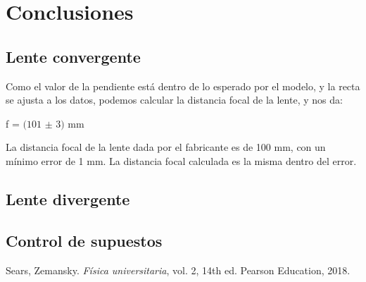 \documentclass[a4paper,12pt]{article}
\newenvironment{Figure}
  {\par\medskip\noindent\minipage{\linewidth}}
  {\endminipage\par\medskip}
\begin{document}
\begin{multicols*}{2}
\begin{Figure}
            \label{tab:supuestos}
        \end{Figure}

\section*{Conclusiones}

    \subsection*{Lente convergente}

        Como el valor de la pendiente está dentro de lo esperado por el modelo, y la recta se ajusta a los datos, podemos calcular la distancia focal de la lente, y nos da:

        f = $(101$ $\pm$ $3)$ mm

        La distancia focal de la lente dada por el fabricante es de 100 mm, con un mínimo error de 1 mm. La distancia focal calculada es la misma dentro del error.

    \subsection*{Lente divergente}
    
        
    
    \subsection*{Control de supuestos}
    
        

\begin{thebibliography}{99}

     Sears, Zemansky. \emph{Física universitaria}, vol. 2, 14th ed. Pearson Education, 2018.

    

\end{thebibliography}

\end{multicols*}
\end{document}
